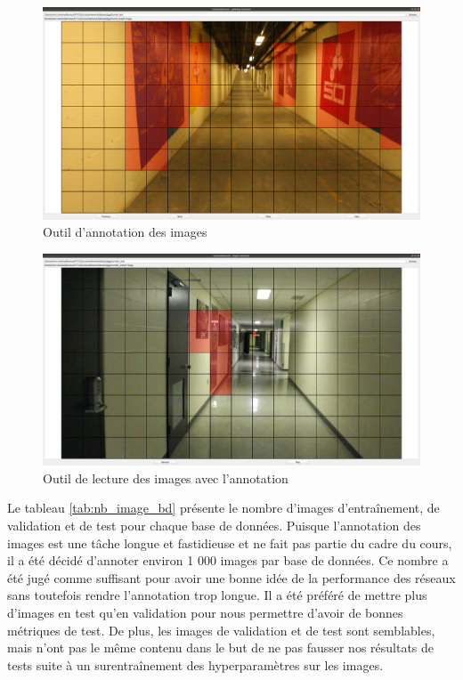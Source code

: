     \begin{figure}[H]
        \centering
        \includegraphics[width=15cm]{images/outil_annotation.png}
        \caption{Outil d'annotation des images}
        \label{fig:outil_annotation}
    \end{figure}

    \begin{figure}[H]
        \centering
        \includegraphics[width=15cm]{images/outil_lecture.png}
        \caption{Outil de lecture des images avec l'annotation}
        \label{fig:outil_lecture}
    \end{figure}

    Le tableau \ref{tab:nb_image_bd} présente le nombre d'images d'entraînement, de validation et de test pour chaque base de données. Puisque l'annotation des images est une tâche longue et fastidieuse et ne fait pas partie du cadre du cours, il a été décidé d'annoter environ 1 000 images par base de données. Ce nombre a été jugé comme suffisant pour avoir une bonne idée de la performance des réseaux sans toutefois rendre l'annotation trop longue. Il a été préféré de mettre plus d'images en test qu'en validation pour nous permettre d'avoir de bonnes métriques de test. De plus, les images de validation et de test sont semblables, mais n'ont pas le même contenu dans le but de ne pas fausser nos résultats de tests suite à un surentraînement des hyperparamètres sur les images. 
    
